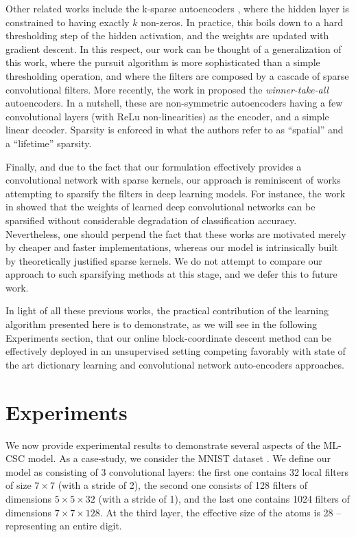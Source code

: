 \documentclass[10pt,journal]{IEEEtran}
\theoremstyle{plain}
\theoremstyle{definition}
\begin{document}
Other related works include the k-sparse autoencoders \cite{makhzani2013k}, where the hidden layer is constrained to having exactly $k$ non-zeros. In practice, this boils down to a hard thresholding step of the hidden activation, and the weights are updated with gradient descent. In this respect, our work can be thought of a generalization of this work, where the pursuit algorithm is more sophisticated than a simple thresholding operation, and where the filters are composed by a cascade of sparse convolutional filters. 
More recently, the work in \cite{makhzani2015winner} proposed the \emph{winner-take-all} autoencoders. In a nutshell, these are non-symmetric autoencoders having a few convolutional layers (with ReLu non-linearities) as the encoder, and a simple linear decoder. Sparsity is enforced in what the authors refer to as ``spatial'' and a ``lifetime'' sparsity. 

Finally, and due to the fact that our formulation effectively provides a convolutional network with sparse kernels, our approach is reminiscent of works attempting to sparsify the filters in deep learning models. For instance, the work in \cite{liu2015sparse} showed that the weights of learned deep convolutional networks can be sparsified without considerable degradation of classification accuracy. Nevertheless, one should perpend the fact that these works are motivated merely by cheaper and faster implementations, whereas our model is intrinsically built by theoretically justified sparse kernels. We do not attempt to compare our approach to such sparsifying methods at this stage, and we defer this to future work.

In light of all these previous works, the practical contribution of the learning algorithm presented here is to demonstrate, as we will see in the following Experiments section, that our online block-coordinate descent method can be effectively deployed in an unsupervised setting competing favorably with state of the art dictionary learning and convolutional network auto-encoders approaches. 



 





\section{Experiments}
\label{sec:experiments}
We now provide experimental results to demonstrate several aspects of the ML-CSC model. As a case-study, we consider the MNIST dataset \cite{MNIST}. We define our model as consisting of 3 convolutional layers: the first one contains 32 local filters of size $7\times 7$ (with a stride of 2), the second one consists of 128 filters of dimensions $5\times5\times32$ (with a stride of 1), and the last one contains 1024 filters of dimensions $7\times7\times128$. At the third layer, the effective size of the atoms is 28 -- representing an entire digit. 
\end{document}
